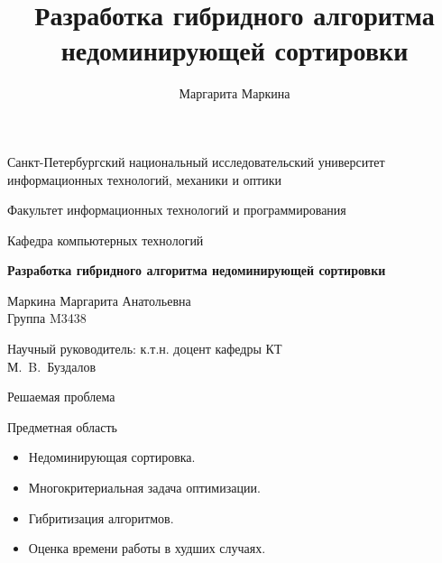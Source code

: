 \documentclass{beamer}
\title[Гибридный алгоритм недоминирующей сортировки]{Разработка гибридного алгоритма недоминирующей сортировки}
\author[Маргарита Маркина]{Маргарита Маркина}
\institute[Университет ИТМО]{Национальный исследовательский университет информационных технологий, механики и оптики}
\date{}
\begin{document}
\begin{frame}
\begin{center}
{\scriptsize Санкт-Петербургский национальный исследовательский университет \\ информационных технологий, механики и оптики}

\vspace{1cm}

{\scriptsize Факультет информационных технологий и программирования

Кафедра компьютерных технологий}

\vspace{1cm}

\vbox{\large\bfseries
Разработка гибридного алгоритма недоминирующей сортировки}

\vspace{1cm}

{\large Маркина Маргарита Анатольевна \\}
{\large Группа M3438}


\vspace{1cm}

{\large Научный руководитель: к.т.н. доцент кафедры КТ \\}
{\large М.~B.~Буздалов}


\end{center}
\end{frame}


\begin{frame}{Решаемая проблема}
\begin{block}{Предметная область}
\begin{itemize}
\item Недоминирующая сортировка.
\item Многокритериальная задача оптимизации.
\item Гибритизация алгоритмов.
\item Оценка времени работы в худших случаях.
\end{itemize}
\end{block}
\end{frame}
\end{document}
